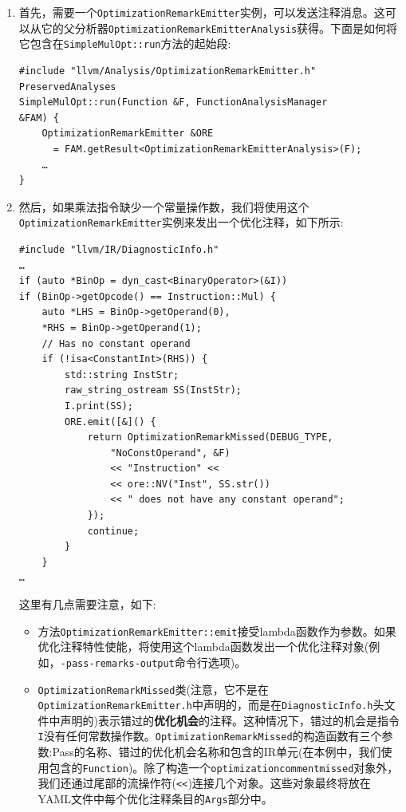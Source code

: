 \begin{enumerate}
\item 首先，需要一个\texttt{OptimizationRemarkEmitter}实例，可以发送注释消息。这可以从它的父分析器\texttt{OptimizationRemarkEmitterAnalysis}获得。下面是如何将它包含在\texttt{SimpleMulOpt::run}方法的起始段:

\begin{lstlisting}[style=styleCXX]
#include "llvm/Analysis/OptimizationRemarkEmitter.h"
PreservedAnalyses
SimpleMulOpt::run(Function &F, FunctionAnalysisManager
&FAM) {
	OptimizationRemarkEmitter &ORE
	  = FAM.getResult<OptimizationRemarkEmitterAnalysis>(F);
	…
}
\end{lstlisting}

\item 然后，如果乘法指令缺少一个常量操作数，我们将使用这个\texttt{OptimizationRemarkEmitter}实例来发出一个优化注释，如下所示:

\begin{lstlisting}[style=styleCXX]
#include "llvm/IR/DiagnosticInfo.h"
…
if (auto *BinOp = dyn_cast<BinaryOperator>(&I))
if (BinOp->getOpcode() == Instruction::Mul) {
	auto *LHS = BinOp->getOperand(0),
	*RHS = BinOp->getOperand(1);
	// Has no constant operand
	if (!isa<ConstantInt>(RHS)) {
		std::string InstStr;
		raw_string_ostream SS(InstStr);
		I.print(SS);
		ORE.emit([&]() {
			return OptimizationRemarkMissed(DEBUG_TYPE,
				"NoConstOperand", &F)
				<< "Instruction" <<
				<< ore::NV("Inst", SS.str())
				<< " does not have any constant operand";
			});
			continue;
		}
	}
…
\end{lstlisting}

这里有几点需要注意，如下:

\begin{itemize}
\item 方法\texttt{OptimizationRemarkEmitter::emit}接受lambda函数作为参数。如果优化注释特性使能，将使用这个lambda函数发出一个优化注释对象(例如，\texttt{-pass-remarks-output}命令行选项)。

\item \texttt{OptimizationRemarkMissed}类(注意，它不是在\texttt{OptimizationRemarkEmitter.h}中声明的，而是在\texttt{DiagnosticInfo.h}头文件中声明的)表示错过的\textbf{优化机会}的注释。这种情况下，错过的机会是指令\texttt{I}没有任何常数操作数。\texttt{OptimizationRemarkMissed}的构造函数有三个参数:Pass的名称、错过的优化机会名称和包含的IR单元(在本例中，我们使用包含的\texttt{Function})。除了构造一个\texttt{optimizationcommentmissed}对象外，我们还通过尾部的流操作符(\texttt{<<})连接几个对象。这些对象最终将放在YAML文件中每个优化注释条目的\texttt{Args}部分中。


\end{itemize}
\end{enumerate}

